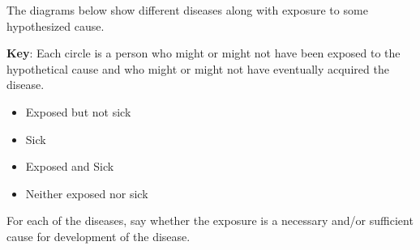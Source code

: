 
The diagrams below show different diseases along with exposure to
some hypothesized cause.  

{\bf Key}: Each circle is a person who might or might not have been exposed to the hypothetical cause and who might or might not have eventually acquired the disease.
\begin{itemize}
\item Exposed but not sick 
\item Sick 
\item Exposed and Sick 
\item Neither exposed nor sick 
\end{itemize}


For each of the diseases, say whether the
exposure is a necessary and/or sufficient cause for development of the disease.


